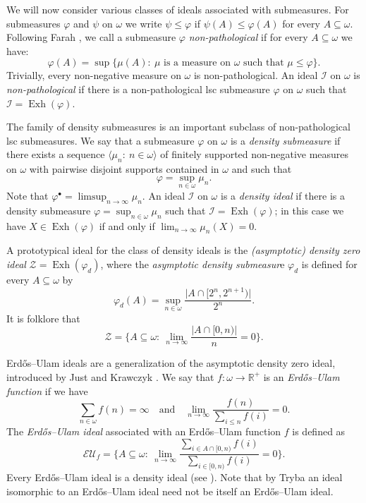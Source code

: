 \documentclass[a4paper,11pt,fleqn]{amsart}
\theoremstyle{definition}
\theoremstyle{remark}
\numberwithin{equation}{section}
\newcommand{\N}{\mathbb{N}}
\newcommand{\R}{\mathbb{R}}
\newcommand{\iI}{\mathcal{I}}
\newcommand{\zZ}{\mathcal{Z}}
\DeclareMathOperator{\exh}{Exh}
\newcommand{\sub}{\subseteq}
\newcommand{\seqn}[1]{\big\langle#1\colon\ n\io\big\rangle}
\newcommand{\io}{\in\omega}%
\newcommand{\erdos}{{Erd\H{o}s}}
\begin{document}
\medskip

We will now consider various classes of ideals associated with submeasures. For submeasures $\varphi$ and $\psi$ on $\omega$ we write $\psi\leq\varphi$ if $\psi(A)\leq\varphi(A)$ for every $A\sub\omega$. Following Farah \cite[page 21]{Far00}, we call a submeasure $\varphi$ \textit{non-pathological} if for every $A\sub\omega$ we have:
\[ \varphi(A)=\sup \big\{\mu(A)\colon\ \mu\textrm{ is a measure on } \omega \textrm{ such that } \mu\leq\varphi\big\}.\]
Trivially, every non-negative measure on $\omega$ is non-pathological. An ideal $\iI$ on $\omega$ is \textit{non-pathological} if there is a non-pathological lsc submeasure $\varphi$ on $\omega$ such that $\iI=\exh(\varphi)$.

\medskip

The family of density submeasures is an important subclass of non-pathological lsc submeasures. We say that a submeasure $\varphi$ on $\omega$ is a \textit{density submeasure} if there exists a sequence $\seqn{\mu_n}$ of finitely supported non-negative measures on $\omega$ with pairwise disjoint supports contained in $\omega$ and
such that 
\[\varphi = \sup_{n\in\omega}\mu_n.\]
Note that $\varphi^\bullet=\limsup_{n\to\infty}\mu_n$. An ideal $\iI$ on $\omega$ is a \textit{density ideal} if there is a density submeasure $\varphi=\sup_{n\io}\mu_n$ such that $\iI=\exh(\varphi)$; in this case we have $X\in\exh(\varphi)$ if and only if 
$\lim_{n\to\infty}\mu_n(X)=0$.

A prototypical ideal for the class of density ideals is the \textit{(asymptotic) density zero
ideal} $\zZ = \exh(\varphi_d)$, where the \textit{asymptotic density submeasur}e $\varphi_d$ is defined for every $A\sub\omega$ by
\[\varphi_d(A)=\sup_{n\io}\frac{\big|A\cap [2^n,2^{n+1})\big|}{2^n}.\]
It is folklore that
\[\zZ=\bigg\{A\sub\omega\colon\ \lim_{n\to\infty}\frac{|A\cap[0,n)|}{n}=0\bigg\}.\]

\erdos--Ulam ideals are a generalization of the asymptotic density zero ideal, introduced by Just and Krawczyk \cite{JK84}.  %
We say that $f\colon\omega\to\R^+$ is an \textit{\erdos--Ulam function} if we have
\[\sum_{n\in\omega} f(n) = \infty\quad\textrm{and}\quad\lim_{n\to\infty} \frac{f(n)}{\sum_{i\leq n} f(i)} = 0.\]
The \textit{\erdos--Ulam ideal} associated with an \erdos--Ulam function $f$ is defined as
\[\mathcal{EU}_f=\bigg\{A\sub\omega\colon\ \lim_{n\to\infty}\frac{\sum_{i\in A\cap[0,n)}f(i)}{\sum_{i\in[0,n)}f(i)}=0\bigg\}.\]
Every \erdos--Ulam ideal is a density ideal (see \cite[Section 1.13]{Far00}). Note that by Tryba \cite[Corollary 3.9]{Try21} an ideal isomorphic to an \erdos--Ulam ideal need not be itself an \erdos--Ulam ideal.
\end{document}
